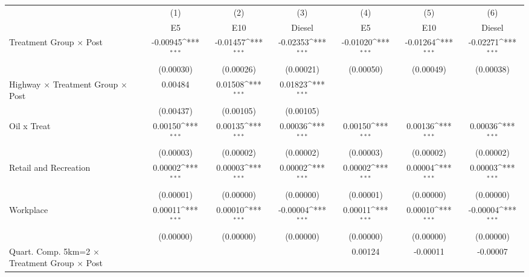 {
\def\sym#1{\ifmmode^{#1}\else\(^{#1}\)\fi}
\begin{tabular}{l*{6}{c}}
\toprule
                    &\multicolumn{1}{c}{(1)}&\multicolumn{1}{c}{(2)}&\multicolumn{1}{c}{(3)}&\multicolumn{1}{c}{(4)}&\multicolumn{1}{c}{(5)}&\multicolumn{1}{c}{(6)}\\
                    &\multicolumn{1}{c}{E5}&\multicolumn{1}{c}{E10}&\multicolumn{1}{c}{Diesel}&\multicolumn{1}{c}{E5}&\multicolumn{1}{c}{E10}&\multicolumn{1}{c}{Diesel}\\
\midrule
Treatment Group $\times$ Post&    -0.00945\sym{***}&    -0.01457\sym{***}&    -0.02353\sym{***}&    -0.01020\sym{***}&    -0.01264\sym{***}&    -0.02271\sym{***}\\
                    &   (0.00030)         &   (0.00026)         &   (0.00021)         &   (0.00050)         &   (0.00049)         &   (0.00038)         \\
Highway $\times$ Treatment Group $\times$ Post&     0.00484         &     0.01508\sym{***}&     0.01823\sym{***}&                     &                     &                     \\
                    &   (0.00437)         &   (0.00105)         &   (0.00105)         &                     &                     &                     \\
Oil x Treat         &     0.00150\sym{***}&     0.00135\sym{***}&     0.00036\sym{***}&     0.00150\sym{***}&     0.00136\sym{***}&     0.00036\sym{***}\\
                    &   (0.00003)         &   (0.00002)         &   (0.00002)         &   (0.00003)         &   (0.00002)         &   (0.00002)         \\
Retail and Recreation&     0.00002\sym{***}&     0.00003\sym{***}&     0.00002\sym{***}&     0.00002\sym{***}&     0.00004\sym{***}&     0.00003\sym{***}\\
                    &   (0.00001)         &   (0.00000)         &   (0.00000)         &   (0.00001)         &   (0.00000)         &   (0.00000)         \\
Workplace           &     0.00011\sym{***}&     0.00010\sym{***}&    -0.00004\sym{***}&     0.00011\sym{***}&     0.00010\sym{***}&    -0.00004\sym{***}\\
                    &   (0.00000)         &   (0.00000)         &   (0.00000)         &   (0.00000)         &   (0.00000)         &   (0.00000)         \\
Quart. Comp. 5km=2 $\times$ Treatment Group $\times$ Post&                     &                     &                     &     0.00124         &    -0.00011         &    -0.00007         \\

\end{tabular}}
